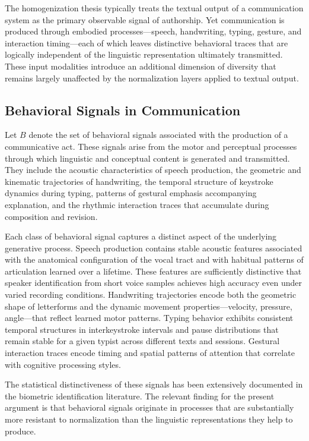 \documentclass[12pt,a4paper]{article}
\theoremstyle{definition}
\theoremstyle{plain}
\theoremstyle{remark}
\begin{document}
The homogenization thesis typically treats the textual output of a communication system as
the primary observable signal of authorship. Yet communication is produced through embodied
processes---speech, handwriting, typing, gesture, and interaction timing---each of which
leaves distinctive behavioral traces that are logically independent of the linguistic
representation ultimately transmitted. These input modalities introduce an additional
dimension of diversity that remains largely unaffected by the normalization layers applied
to textual output.

\subsection{Behavioral Signals in Communication}

Let $B$ denote the set of behavioral signals associated with the production of a
communicative act. These signals arise from the motor and perceptual processes through which
linguistic and conceptual content is generated and transmitted. They include the acoustic
characteristics of speech production, the geometric and kinematic trajectories of
handwriting, the temporal structure of keystroke dynamics during typing, patterns of gestural
emphasis accompanying explanation, and the rhythmic interaction traces that accumulate during
composition and revision.

Each class of behavioral signal captures a distinct aspect of the underlying generative
process. Speech production contains stable acoustic features associated with the anatomical
configuration of the vocal tract and with habitual patterns of articulation learned over a
lifetime. These features are sufficiently distinctive that speaker identification from short
voice samples achieves high accuracy even under varied recording conditions. Handwriting
trajectories encode both the geometric shape of letterforms and the dynamic movement
properties---velocity, pressure, angle---that reflect learned motor patterns. Typing behavior
exhibits consistent temporal structures in interkeystroke intervals and pause distributions
that remain stable for a given typist across different texts and sessions. Gestural
interaction traces encode timing and spatial patterns of attention that correlate with
cognitive processing styles.

The statistical distinctiveness of these signals has been extensively documented in the
biometric identification literature. The relevant finding for the present argument is that
behavioral signals originate in processes that are substantially more resistant to
normalization than the linguistic representations they help to produce.
\end{document}
